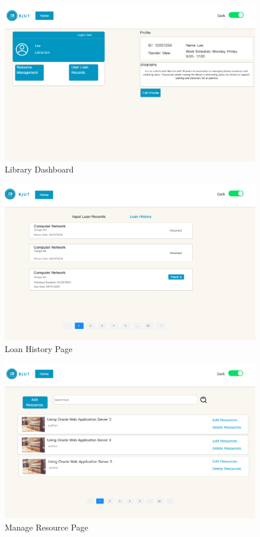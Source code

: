 \documentclass[12pt]{article}
\begin{document}
\begin{figure}[H]
    \centering
    \includegraphics[width=\textwidth]{mockups/library/librarydash.png}
    \caption{Library Dashboard}
    \label{fig:library_dashboard_page}
\end{figure}

\begin{figure}[H]
    \centering
    \includegraphics[width=\textwidth]{mockups/library/loanhistory.png}
    \caption{Loan History Page}
    \label{fig:library_loanhistory_page}
\end{figure}

\begin{figure}[H]
    \centering
    \includegraphics[width=\textwidth]{mockups/library/manageresource.png}
    \caption{Manage Resource Page}
    \label{fig:library_manageresource_page}
\end{figure}
\end{document}
